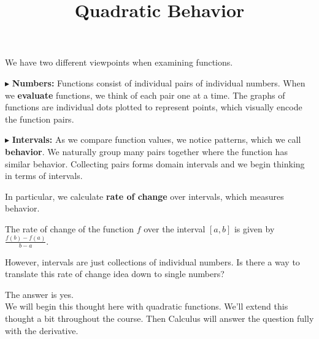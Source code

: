 \documentclass{ximera}
\title{Quadratic Behavior}
\begin{document}
\begin{abstract}
\end{abstract}
\maketitle







We have two different viewpoints when examining functions.


$\blacktriangleright$ \textbf{Numbers:}  Functions consist of individual pairs of individual numbers.  When we \textbf{\textcolor{purple!85!blue}{evaluate}} functions, we think of each pair one at a time.  The graphs of functions are individual dots plotted to represent points, which visually encode the function pairs. 







$\blacktriangleright$ \textbf{Intervals:} As we compare function values, we notice patterns, which we call \textbf{\textcolor{purple!85!blue}{behavior}}. We naturally group many pairs together where the function has similar behavior.  Collecting pairs forms domain intervals and we begin thinking in terms of intervals.





In particular, we calculate \textbf{\textcolor{blue!55!black}{rate of change}} over intervals, which measures behavior. 



The rate of change of the function $f$ over the interval $[a, b]$ is given by $\frac{f(b) - f(a)}{b - a}$.




However, intervals are just collections of individual numbers.  Is there a way to translate this rate of change idea down to single numbers?

The answer is yes.  \\


We will begin this thought here with quadratic functions. We'll extend this thought a bit throughout the course. Then Calculus will answer the question fully with the derivative.
\end{document}
